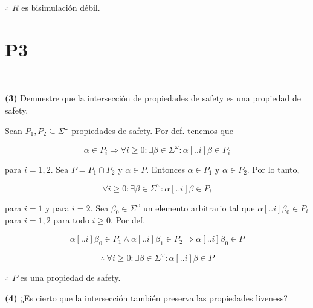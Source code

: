 \documentclass[a4paper, 12pt]{article}
\begin{document}
$\therefore $ $R$ es bisimulación débil.










\pagebreak
\section{P3}

~ 

\begin{myframe}
    \textbf{(3)} Demuestre que la intersección de propiedades de safety es una propiedad de safety.
\end{myframe}

Sean $P_1, P_2 \subseteq \Sigma^\omega$ propiedades de safety. Por def. tenemos que 

\begin{equation*}
    \alpha \in P_i \Rightarrow  \forall i \geq 0 : \exists \beta \in
    \Sigma^\omega : \alpha[..i] \beta
    \in P_i
\end{equation*}

para $i = 1, 2$. Sea $P = P_1 \cap P_2$ y $\alpha \in P$. Entonces $\alpha \in
P_1$ y $\alpha \in P_2$. Por lo tanto, 

\begin{equation*}
    \forall i \geq 0 : \exists  \beta \in \Sigma^\omega : \alpha[..i]\beta \in
    P_i
\end{equation*}

para $i = 1$ y para $i = 2$. Sea $\beta_0 \in \Sigma^\omega$ un elemento
arbitrario tal que $\alpha[..i]\beta_0 \in P_i$ para $i = 1, 2$ para todo $i \geq
0$. Por def. 

$$\alpha[..i]\beta_0 \in P_1 \land  \alpha[..i]\beta_1 \in P_2 \Rightarrow
\alpha[..i]\beta_0 \in P $$

\begin{equation*}
    \therefore  ~ \forall  i \geq 0 : \exists  \beta \in \Sigma^\omega :
    \alpha[..i]\beta \in P
\end{equation*}

$\therefore $ $P$ es una propiedad de safety.

\pagebreak

\begin{myframe}
    \textbf{(4)} ¿Es cierto que la intersección también preserva las propiedades liveness?
\end{myframe}

~
\end{document}
